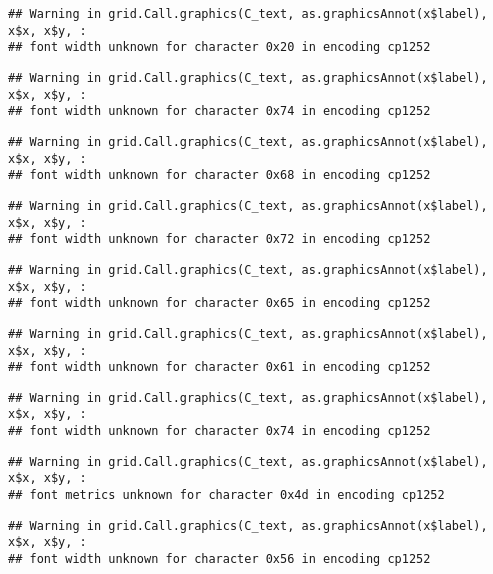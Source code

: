 \documentclass[
]{article}
\begin{document}
\begin{verbatim}
## Warning in grid.Call.graphics(C_text, as.graphicsAnnot(x$label), x$x, x$y, :
## font width unknown for character 0x20 in encoding cp1252
\end{verbatim}

\begin{verbatim}
## Warning in grid.Call.graphics(C_text, as.graphicsAnnot(x$label), x$x, x$y, :
## font width unknown for character 0x74 in encoding cp1252
\end{verbatim}

\begin{verbatim}
## Warning in grid.Call.graphics(C_text, as.graphicsAnnot(x$label), x$x, x$y, :
## font width unknown for character 0x68 in encoding cp1252
\end{verbatim}

\begin{verbatim}
## Warning in grid.Call.graphics(C_text, as.graphicsAnnot(x$label), x$x, x$y, :
## font width unknown for character 0x72 in encoding cp1252
\end{verbatim}

\begin{verbatim}
## Warning in grid.Call.graphics(C_text, as.graphicsAnnot(x$label), x$x, x$y, :
## font width unknown for character 0x65 in encoding cp1252
\end{verbatim}

\begin{verbatim}
## Warning in grid.Call.graphics(C_text, as.graphicsAnnot(x$label), x$x, x$y, :
## font width unknown for character 0x61 in encoding cp1252
\end{verbatim}

\begin{verbatim}
## Warning in grid.Call.graphics(C_text, as.graphicsAnnot(x$label), x$x, x$y, :
## font width unknown for character 0x74 in encoding cp1252
\end{verbatim}

\begin{verbatim}
## Warning in grid.Call.graphics(C_text, as.graphicsAnnot(x$label), x$x, x$y, :
## font metrics unknown for character 0x4d in encoding cp1252
\end{verbatim}

\begin{verbatim}
## Warning in grid.Call.graphics(C_text, as.graphicsAnnot(x$label), x$x, x$y, :
## font width unknown for character 0x56 in encoding cp1252
\end{verbatim}
\end{document}
